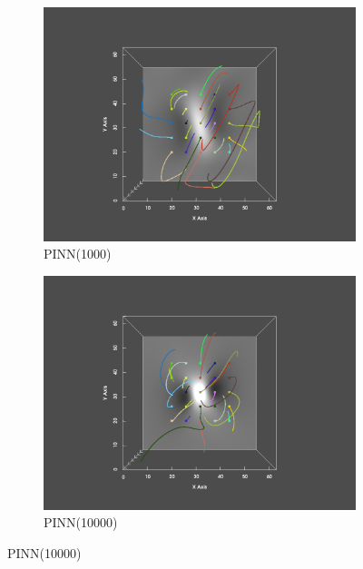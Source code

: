 \begin{figure}
  \begin{subfigure}{.5\linewidth}
    \centering
    \caption{PINN(1000)}
    \includegraphics[trim={6cm 1cm 6cm 2cm}, clip, width=\linewidth]{"img/PINN_001000_xy.pdf"}
  \end{subfigure}%
  \begin{subfigure}{.5\linewidth}
    \centering
    \caption{PINN(10000)}
    \includegraphics[trim={6cm 1cm 6cm 2cm}, clip, width=\linewidth]{"img/PINN_010000_xy.pdf"}
  \end{subfigure}


\end{figure}
